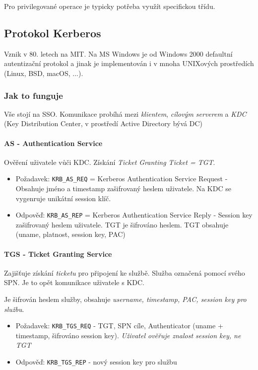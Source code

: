 \documentclass[10pt,a4paper]{article}
\begin{document}
Pro privilegované operace je typicky potřeba využít specifickou třídu.


\subsection{Protokol Kerberos}
Vznik v 80. letech na MIT. Na MS Windows je od Windows 2000 defaultní autentizační protokol a jinak je implementován i v mnoha UNIXových prostředích (Linux, BSD, macOS, ...).



\subsubsection*{Jak to funguje}
Vše stojí na SSO.
Komunikace probíhá mezi \textit{klientem}, \textit{cílovým serverem} a \textit{KDC} (Key Distribution Center, v prostředí Active
Directory bývá DC)


\paragraph{AS - Authentication Service}
Ověření uživatele vůči KDC. Získání \textit{Ticket Granting Ticket = TGT}. 
	
\begin{itemize}\setlength\itemsep{0em}
	\item Požadavek: \texttt{KRB\_AS\_REQ} = Kerberos Authentication Service Request - Obsahuje jméno a timestamp zašifrovaný heslem uživatele. Na KDC se vygenruje unikátní session klíč.
	\item Odpověď: \texttt{KRB\_AS\_REP} = Kerberos Authentication Service Reply - Session key zašifrovaný heslem uživatele. TGT je šifrováno heslem. TGT obsahuje (uname, platnost, session key, PAC)
\end{itemize}



\paragraph{TGS - Ticket Granting Service}
Zajišťuje získání \textit{ticketu} pro připojení ke službě. 
Služba označená pomocí svého SPN. 
Je to opět komunikace uživatele s KDC.

Je šifrován heslem služby, obsahuje \textit{username, timestamp, PAC, session key pro službu}.

\begin{itemize}\setlength\itemsep{0em}
	\item Požadavek: \texttt{KRB\_TGS\_REQ} - TGT, SPN cíle, Authenticator (uname + timestamp, šifrováno session key). \textit{Uživatel ověřuje znalost session key, ne TGT}
	\item Odpověď: \texttt{KRB\_TGS\_REP} - nový session key pro službu
\end{itemize}
\end{document}
